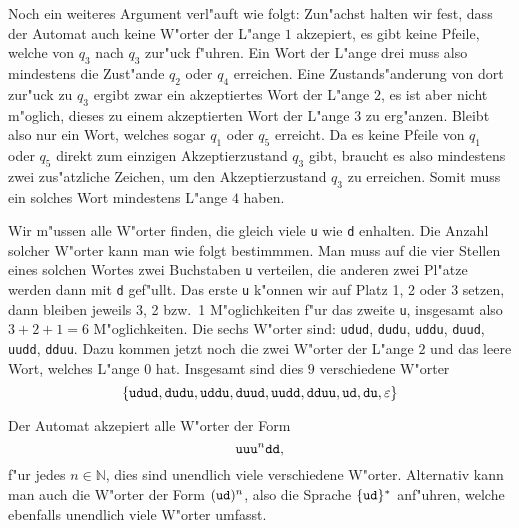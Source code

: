\begin{loesung}
\begin{teilaufgaben}
Noch ein weiteres Argument verl"auft wie folgt:
Zun"achst halten wir fest, dass der Automat auch keine W"orter der
L"ange $1$ akzepiert, es gibt keine Pfeile, welche von $q_3$ nach
$q_3$ zur"uck f"uhren. Ein Wort der L"ange drei muss also mindestens
die Zust"ande $q_2$ oder $q_4$ erreichen. Eine Zustands"anderung von
dort zur"uck zu $q_3$ ergibt zwar ein akzeptiertes Wort der L"ange
$2$, es ist aber nicht m"oglich, dieses zu einem akzeptierten Wort
der L"ange $3$ zu erg"anzen.
Bleibt also nur ein Wort, welches
sogar $q_1$ oder $q_5$ erreicht. Da es keine Pfeile von $q_1$
oder $q_5$ direkt zum einzigen Akzeptierzustand $q_3$ gibt,
braucht es also mindestens zwei zus"atzliche Zeichen, um den
Akzeptierzustand $q_3$ zu erreichen. Somit muss ein solches
Wort mindestens L"ange $4$ haben.
\item Wir m"ussen alle W"orter finden, die gleich viele {\tt u} wie {\tt d}
enhalten. Die Anzahl solcher W"orter kann man wie folgt bestimmmen.
Man muss auf die vier Stellen eines solchen Wortes zwei Buchstaben
{\tt u} verteilen, die anderen zwei Pl"atze werden dann mit {\tt d}
gef"ullt. Das erste {\tt u} k"onnen wir auf Platz 1, 2 oder 3 setzen,
dann bleiben jeweils 3, 2 bzw.~1 M"oglichkeiten f"ur das zweite {\tt u},
insgesamt also $3+2+1=6$ M"oglichkeiten. Die sechs W"orter sind:
{\tt udud}, {\tt dudu}, {\tt uddu}, {\tt duud}, {\tt uudd}, {\tt dduu}.
Dazu kommen jetzt noch die zwei W"orter der L"ange $2$ und das leere Wort,
welches L"ange $0$ hat. Insgesamt sind dies $9$ verschiedene W"orter
\[
\{
{\tt udud}, {\tt dudu}, {\tt uddu}, {\tt duud}, {\tt uudd}, {\tt dduu},
{\tt ud},{\tt du}, \varepsilon
\}
\]
\item Der Automat akzepiert alle W"orter der Form
\[
\text{\tt uu}
\text{\tt u}^n
\text{\tt dd},
\]
f"ur jedes $n\in \mathbb N$,
dies sind unendlich viele verschiedene W"orter. Alternativ kann
man auch die W"orter der Form $({\tt ud})^n$, also die Sprache
$\{{\tt ud}\}^*$ anf"uhren, welche ebenfalls unendlich viele W"orter
umfasst.
\end{teilaufgaben}
\end{loesung}

